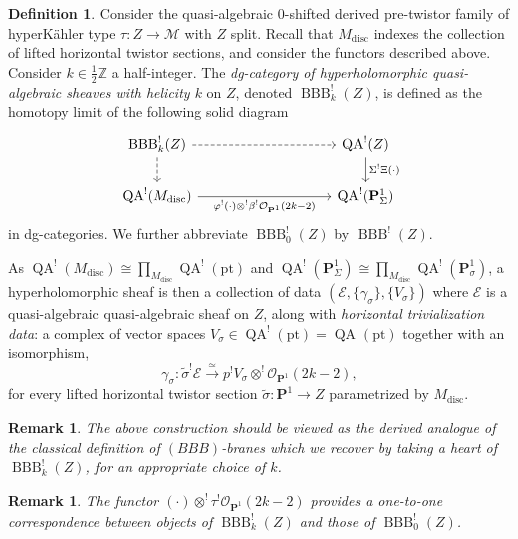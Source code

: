 \documentclass[11pt, a4paper]{amsart}
\numberwithin{equation}{section}
\newtheorem{remark}[theorem]{Remark}
\theoremstyle{definition}
\newtheorem{definition}[theorem]{Definition}
\theoremstyle{remark}
\DeclareMathOperator{\QA}{QA}
\DeclareMathOperator{\BBB}{BBB}
\DeclareMathOperator{\discrete}{\mathrm{disc}}
\newcommand{\Ee}{\mathcal{E}}
\newcommand{\Mm}{\mathcal{M}}
\newcommand{\Oo}{\mathcal{O}}
\renewcommand{\P}{\mathbf{P}}
\newcommand{\wt}[1]{\widetilde{#1}}
\newcommand{\ZZ}{\mathbb{Z}}
\renewcommand{\to}{\longrightarrow}
\begin{document}
\begin{definition}\label{definition ideal twistor category}
Consider the quasi-algebraic $0$-shifted derived pre-twistor family of hyperKähler type $\tau : Z \to \Mm$ with $Z$ split. Recall that $M_{\discrete}$ indexes the collection of lifted horizontal twistor sections, and consider the functors described above. Consider $k \in \frac{1}{2}\ZZ$ a half-integer. The {\it dg-category of hyperholomorphic quasi-algebraic sheaves with helicity $k$} on $Z$, denoted $\BBB^!_k(Z)$, is defined as the homotopy limit of the following solid diagram
    $$
    \begin{tikzcd}
	{\BBB^!_k(Z)} & & & & 
    {\QA^!(Z)} \\
	{\QA^!(M_{\discrete})} & & & & {\QA^!(\P^1_{\Sigma})}
	\arrow[dashed, from=1-1, to=1-5]
	\arrow[dashed, from=1-1, to=2-1]
	\arrow["{\Sigma^! \Xi (\cdot)}", from=1-5, to=2-5]
	\arrow["{\varphi^!(\cdot) \otimes^! \beta^!\Oo_{\P^1}(2k-2)}"', from=2-1, to=2-5]
\end{tikzcd}
    $$
    in dg-categories. We further abbreviate $\BBB^!_0(Z)$ by $\BBB^!(Z)$. 

As $\QA^!(M_{\discrete}) \cong \prod_{M_{\discrete}}\QA^!(\mathrm{pt})$ and $\QA^!(\P^1_{\Sigma}) \cong \prod_{M_{\discrete}}\QA^!(\P^1_\sigma)$, a hyperholomorphic sheaf is then a collection of data $(\Ee, \{\gamma_\sigma\}, \{V_\sigma\})$ where $\Ee$ is a quasi-algebraic quasi-algebraic sheaf on $Z$, along with \textit{horizontal trivialization data}: a complex of vector spaces $V_\sigma \in \QA^!(\mathrm{pt}) = \QA(\mathrm{pt})$ together with an isomorphism,
\[
\gamma_\sigma: \wt \sigma^!\Ee \stackrel{\simeq}{\to} p^!V_\sigma \otimes^! \Oo_{\P^1}(2k-2),
\]
for every lifted horizontal twistor section $\wt \sigma: \P^1 \to Z$ parametrized by $M_{\discrete}$.
\end{definition}

\begin{remark}
The above construction should be viewed as the derived analogue of the classical definition of $(BBB)$-branes which we recover by taking a heart of $\BBB^!_k(Z)$, for an appropriate choice of $k$.
\end{remark}

\begin{remark}
The functor $(\cdot) \otimes^! \tau^!\Oo_{\P^1}(2k-2)$ provides a one-to-one correspondence between objects of $\BBB^!_k(Z)$ and those of $\BBB^!_0(Z)$.
\end{remark}
\end{document}
